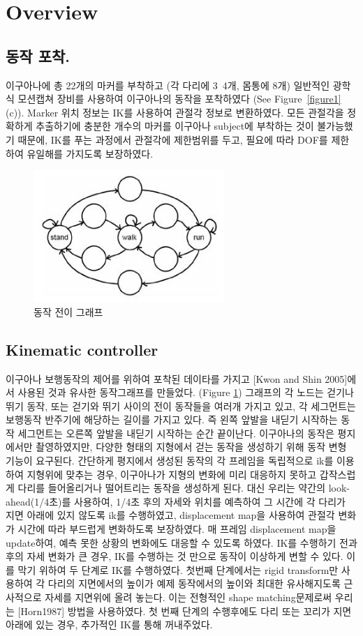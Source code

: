 \documentclass[11pt,a4paper]{article}
\begin{document}
\section{Overview}
\subsection{동작 포착.}
               
이구아나에 총 22개의 마커를 부착하고 (각 다리에 3~4개, 몸통에 8개) 일반적인 광학식 모션캡쳐 장비를 사용하여 이구아나의 동작을 포착하였다 (See Figure~\ref{figure1} (c)). Marker 위치 정보는 IK를 사용하여 관절각 정보로 변환하였다. 모든 관절각을 정확하게 추출하기에 충분한 개수의 마커를 이구아나 subject에 부착하는 것이 불가능했기 때문에, IK를 푸는 과정에서 관절각에 제한범위를 두고, 필요에 따라 DOF를 제한하여 유일해를 가지도록 보장하였다.
\begin{figure}[h]
\center
\includegraphics[height=5cm]{figures/graph.jpg}
\caption{동작 전이 그래프\label{graph}}
\end{figure}

\subsection{Kinematic controller}
이구아나 보행동작의 제어를 위하여 포착된 데이타를 가지고 [Kwon and Shin 2005]에서 사용된 것과 유사한 동작그래프를 만들었다. (Figure \ref{graph})
그래프의 각 노드는 걷기나 뛰기 동작, 또는 걷기와 뛰기 사이의 전이 동작들을 여러개 가지고 있고, 각 세그먼트는 보행동작 반주기에 해당하는 길이를 가지고 있다. 즉 왼쪽 앞발을 내딛기 시작하는 동작 세그먼트는 오른쪽 앞발을 내딛기 시작하는 순간 끝이난다. 이구아나의 동작은 평지에서만 촬영하였지만, 다양한 형태의 지형에서 걷는 동작을 생성하기 위해 동작 변형 기능이 요구된다. 간단하게 평지에서 생성된 동작의 각 프레임을 독립적으로 ik를 이용하여 지형위에 맞추는 경우, 이구아나가 지형의 변화에 미리 대응하지 못하고 갑작스럽게 다리를 들어올리거나 떨어트리는 동작을 생성하게 된다. 대신 우리는 약간의 look-ahead(1/4초)를 사용하여, 1/4초 후의 자세와 위치를 예측하여 그 시간에 각 다리가 지면 아래에 있지 않도록 ik를 수행하였고, displacement map을 사용하여 관절각 변화가 시간에 따라 부드럽게 변화하도록 보장하였다. 매 프레임 displacement map을 update하여, 예측 못한 상황의 변화에도 대응할 수 있도록 하였다. IK를 수행하기 전과 후의 자세 변화가 큰 경우, IK를 수행하는 것 만으로 동작이 이상하게 변할 수 있다. 이를 막기 위하여 두 단계로 IK를 수행하였다. 첫번째 단계에서는 rigid transform만 사용하여 각 다리의 지면에서의 높이가 예제 동작에서의 높이와 최대한 유사해지도록 근사적으로 자세를 지면위에 올려 놓는다. 이는 전형적인 shape matching문제로써 우리는 [Horn1987] 방법을 사용하였다. 첫 번째 단계의 수행후에도 다리 또는 꼬리가 지면 아래에 있는 경우, 추가적인 IK를 통해 꺼내주었다.
\end{document}
